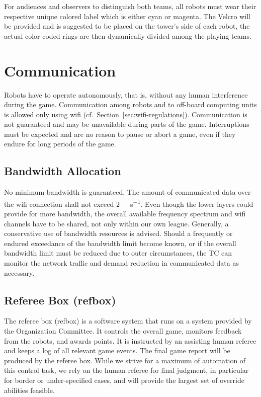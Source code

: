 \documentclass[12pt,twoside]{article}
\newcommand{\refsec}[1]{Section~\ref{#1}}
\begin{document}
For audiences and observers to distinguish both teams, all robots must 
wear their respective unique colored label which is either cyan or magenta. 
The Velcro will be provided and is suggested to be placed on the tower's side 
of each robot, the actual color-coded rings are then dynamically divided among 
the playing teams.

\section{Communication}
\label{sec:communication}

Robots have to operate autonomously, that is, without any human
interference during the game. Communication among robots and to
off-board computing units is allowed only using wifi
(cf.~\refsec{sec:wifi-regulations}). Communication is not guaranteed
and may be unavailable during parts of the game. Interruptions must be
expected and are no reason to pause or abort a game, even if they
endure for long periods of the game.

\subsection{Bandwidth Allocation}
\label{sec:bandwidth}
No minimum bandwidth is guaranteed. The amount of communicated data
over the wifi connection shall not exceed
\SI[per-mode=symbol]{2}{\mega\bit\per\second}. Even though the lower
layers could provide for more bandwidth, the overall available
frequency spectrum and wifi channels have to be shared, not only
within our own league. Generally, a conservative use of bandwidth
resources is advised. Should a frequently or endured exceedance of the
bandwidth limit become known, or if the overall bandwidth limit must
be reduced due to outer circumstances, the TC can monitor the network
traffic and demand reduction in communicated data as necessary.

\subsection{Referee Box (refbox)}
\label{sec:referee-box}
The referee box (refbox) is a software system that runs on a system
provided by the Organization Committee. It controls the overall game,
monitors feedback from the robots, and awards points. It is instructed
by an assisting human referee and keeps a log of all relevant game
events. The final game report will be produced by the referee
box. While we strive for a maximum of automation of this control task,
we rely on the human referee for final judgment, in particular for
border or under-specified cases, and will provide the largest set of
override abilities feasible.
\end{document}
